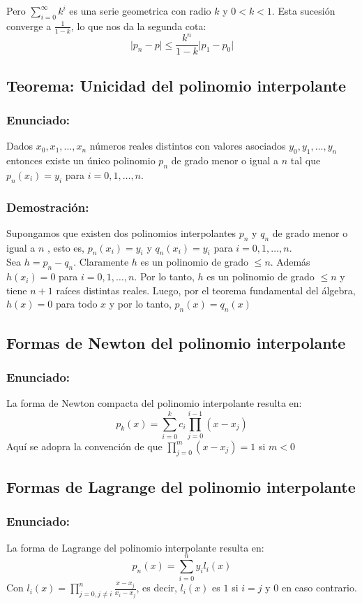 \documentclass[a4paper,12pt]{article}
\begin{document}
Pero $\sum_{i=0}^{\infty}k^i$ es una serie geometrica con radio $k$ y $0<k<1$. Esta sucesión converge a $\frac{1}{1-k}$, lo que nos da la segunda cota:
\[
\lvert p_n-p\rvert \leq \frac{k^n}{1-k}\lvert p_1-p_0\rvert
\]

\subsection{Teorema: Unicidad del polinomio interpolante}
\subsubsection{Enunciado:}

Dados $x_0, x_1,\dots ,x_n$ números reales distintos con valores asociados $y_0, y_1, \dots ,y_n$ entonces existe un único polinomio $p_n$ de grado menor o igual a $n$ tal que $p_n(x_i)=y_i$ para $i=0,1,\dots ,n$.
\subsubsection{Demostración:}
Supongamos que existen dos polinomios interpolantes $p_n$ y $q_n$ de grado menor o igual a $n$ , esto es, $p_n(x_i)=y_i$ y $q_n(x_i)=y_i$ para $i=0,1,\dots ,n$.\\
Sea $h=p_n-q_n$. Claramente $h$ es un polinomio de grado $\leq n$. Además $h(x_i)=0$ para $i=0,1,\dots ,n$. Por lo tanto, $h$  es un polinomio de grado $\leq n$ y tiene $n+1$ raíces distintas reales. Luego, por el teorema fundamental del álgebra, $h(x)=0$ para todo $x$ y por lo tanto, $p_n(x)=q_n(x)$

\subsection{Formas de Newton del polinomio interpolante}
\subsubsection{Enunciado:}
La forma de Newton compacta del polinomio interpolante resulta en:
\[
p_k(x)=\sum_{i=0}^{k}c_i\prod_{j=0}^{i-1}(x-x_j)
\]
Aquí se adopra la convención de que $\prod_{j=0}^{m} (x-x_j)=1$ si $m<0$

\subsection{Formas de Lagrange del polinomio interpolante}
\subsubsection{Enunciado:}
La forma de Lagrange del polinomio interpolante resulta en:
\[
p_n(x)=\sum_{i=0}^{n}y_il_i(x)
\]
Con $l_i(x)=\prod_{j=0, j\neq i}^{n}\frac{x-x_j}{x_i-x_j}$, es decir, $l_i(x)$ es $1$ si $i=j$ y $0$ en caso contrario.
\end{document}
